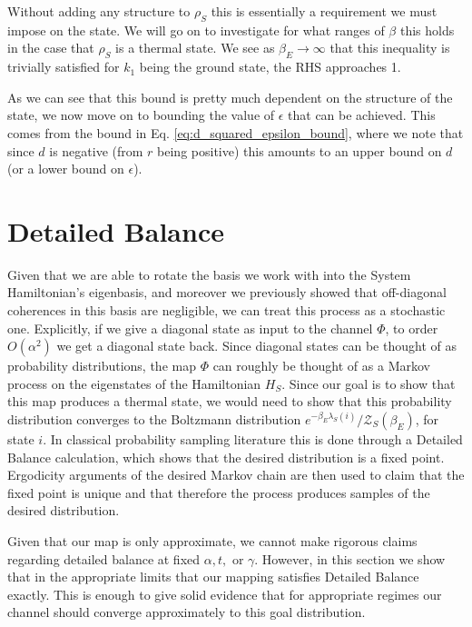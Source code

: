 \documentclass{article}
\newcommand{\bigo}[1]{O\left( #1 \right)}
\newcommand{\partfun}{\mathcal{Z}}
\begin{document}
Without adding any structure to $\rho_S$ this is essentially a requirement we must impose on the state. We will go on to investigate for what ranges of $\beta$ this holds in the case that $\rho_S$ is a thermal state. We see as $\beta_E \to \infty$ that this inequality is trivially satisfied for $k_1$ being the ground state, the RHS approaches 1.

As we can see that this bound is pretty much dependent on the structure of the state, we now move on to bounding the value of $\epsilon$ that can be achieved. This comes from the bound in Eq. \eqref{eq:d_squared_epsilon_bound}, where we note that since $d$ is negative (from $r$ being positive) this amounts to an upper bound on $d$ (or a lower bound on $\epsilon$).




\appendix

\section{Detailed Balance}
Given that we are able to rotate the basis we work with into the System Hamiltonian's eigenbasis, and moreover we previously showed that off-diagonal coherences in this basis are negligible, we can treat this process as a stochastic one. Explicitly, if we give a diagonal state as input to the channel $\Phi$, to order $\bigo{\alpha^2}$ we get a diagonal state back. Since diagonal states can be thought of as probability distributions, the map $\Phi$ can roughly be thought of as a Markov process on the eigenstates of the Hamiltonian $H_S$. Since our goal is to show that this map produces a thermal state,
we would need to show that this probability distribution converges to the Boltzmann distribution $e^{-\beta_E \lambda_S(i)} / \partfun_S(\beta_E)$, for state $i$. In classical probability sampling literature this is done through a Detailed Balance calculation, which shows that the desired distribution is a fixed point. Ergodicity arguments of the desired Markov chain are then used to claim that the fixed point is unique and that therefore the process produces samples of the desired distribution.

Given that our map is only approximate, we cannot make rigorous claims regarding detailed balance at fixed $\alpha, t,$ or $\gamma$. However, in this section we show that in the appropriate limits that our mapping satisfies Detailed Balance exactly. This is enough to give solid evidence that for appropriate regimes our channel should converge approximately to this goal distribution.
\end{document}
